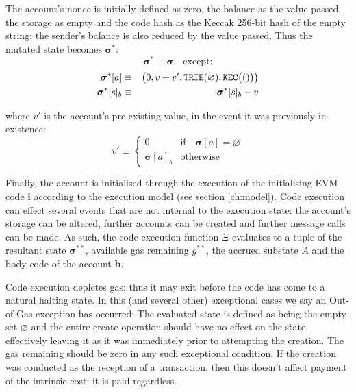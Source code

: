 \documentclass[9pt,oneside]{amsart}
\begin{document}
\begin{multicols}{2}
The account's nonce is initially defined as zero, the balance as the value passed, the storage as empty and the code hash as the Keccak 256-bit hash of the empty string; the sender's balance is also reduced by the value passed. Thus the mutated state becomes $\boldsymbol{\sigma}^*$:
\begin{equation}
\boldsymbol{\sigma}^* \equiv \boldsymbol{\sigma} \quad \text{except:}
\end{equation}
\begin{eqnarray}
\boldsymbol{\sigma}^*[a] &\equiv& \big( 0, v + v', \mathtt{\tiny TRIE}(\varnothing), \mathtt{\tiny KEC}\big(()\big) \big) \\
\boldsymbol{\sigma}^*[s]_b &\equiv& \boldsymbol{\sigma}^*[s]_b - v
\end{eqnarray}

where $v'$ is the account's pre-existing value, in the event it was previously in existence:
\begin{equation}
v' \equiv \begin{cases}
0 & \text{if} \quad \boldsymbol{\sigma}[a] = \varnothing\\
\boldsymbol{\sigma}[a]_b & \text{otherwise}
\end{cases}
\end{equation}


Finally, the account is initialised through the execution of the initialising EVM code $\mathbf{i}$ according to the execution model (see section \ref{ch:model}). Code execution can effect several events that are not internal to the execution state: the account's storage can be altered, further accounts can be created and further message calls can be made. As such, the code execution function $\Xi$ evaluates to a tuple of the resultant state $\boldsymbol{\sigma}^{**}$, available gas remaining $g^{**}$, the accrued substate $A$ and the body code of the account $\mathbf{b}$.

Code execution depletes gas; thus it may exit before the code has come to a natural halting state. In this (and several other) exceptional cases we say an Out-of-Gas exception has occurred: The evaluated state is defined as being the empty set $\varnothing$ and the entire create operation should have no effect on the state, effectively leaving it as it was immediately prior to attempting the creation. The gas remaining should be zero in any such exceptional condition. If the creation was conducted as the reception of a transaction, then this doesn't affect payment of the intrinsic cost: it is paid regardless.


\end{multicols}
\end{document}
